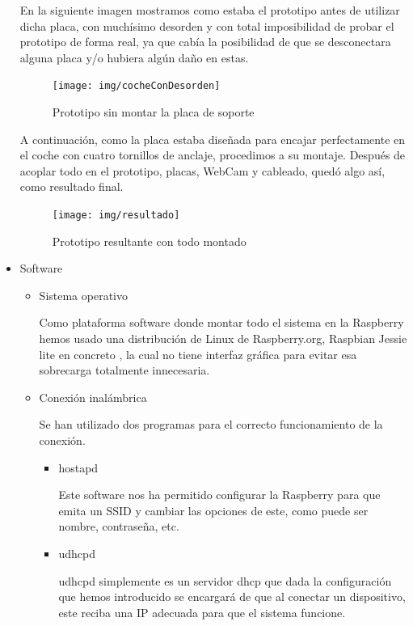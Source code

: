 \documentclass{pclass}
\begin{document}
\begin{itemize}
En la siguiente imagen mostramos como estaba el prototipo antes de utilizar dicha placa, con muchísimo desorden y con total imposibilidad de probar el prototipo de forma real, ya que cabía la posibilidad de que se desconectara alguna placa y/o hubiera algún daño en estas.

\begin{figure}[H]
	\centering
	\texttt{[image: img/cocheConDesorden]}
	\caption{Prototipo sin montar la placa de soporte}
	\label{fig:cochesinsoporte}
\end{figure}

A continuación, como la placa estaba diseñada para encajar perfectamente en el coche con cuatro tornillos de anclaje, procedimos a su montaje. Después de acoplar todo en el prototipo, placas, WebCam y cableado, quedó algo así, como resultado final.

\begin{figure}[H]
	\centering
	\texttt{[image: img/resultado]}
	\caption{Prototipo resultante con todo montado}
	\label{fig:cochesResultante}
\end{figure}

\item Software


\begin{itemize}
	
	\item Sistema operativo
	
	Como plataforma software donde montar todo el sistema en la Raspberry hemos usado una distribución de Linux de Raspberry.org, Raspbian Jessie lite en concreto , la cual no tiene interfaz gráfica para evitar esa sobrecarga totalmente innecesaria.
	\medskip
	
	\item Conexión inalámbrica
	
	Se han utilizado dos programas para el correcto funcionamiento de la conexión.
	
		\begin{itemize}
			\item hostapd
			\smallskip
			
			Este software nos ha permitido configurar la Raspberry para que emita un SSID y cambiar las opciones de este, como puede ser nombre, contraseña, etc.
			\smallskip
			
			\item udhcpd
			\smallskip
			
			udhcpd simplemente es un servidor dhcp que dada la configuración que hemos introducido se encargará de que al conectar un dispositivo, este reciba una IP adecuada para que el sistema funcione.
			

\end{itemize}
\end{itemize}
\end{itemize}
\end{document}
